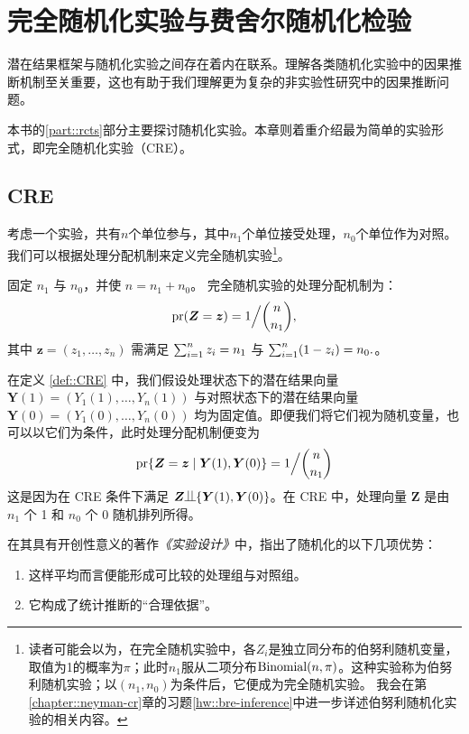 
\chapter{完全随机化实验与费舍尔随机化检验}\label{ch::frt-cre}


潜在结果框架与随机化实验之间存在着内在联系。理解各类随机化实验中的因果推断机制至关重要，这也有助于我们理解更为复杂的非实验性研究中的因果推断问题。  


本书的\ref{part::rcts}部分主要探讨随机化实验。本章则着重介绍最为简单的实验形式，即完全随机化实验（CRE）。 

\section{CRE}

考虑一个实验，共有$n$个单位参与，其中$n_1$个单位接受处理，$n_0$个单位作为对照。我们可以根据处理分配机制来定义完全随机实验\footnote{读者可能会以为，在完全随机实验中，各$Z_i$是独立同分布的伯努利随机变量，取值为1的概率为$\pi$；此时$n_1$服从二项分布$\textup{Binomial}(n,\pi)$。这种实验称为伯努利随机实验；以$(n_1, n_0)$为条件后，它便成为完全随机实验。
我会在第\ref{chapter::neyman-cr}章的习题\ref{hw::bre-inference}中进一步详述伯努利随机化实验的相关内容。
}。

\begin{definition}
[CRE]\label{def::CRE}
固定 $n_1$ 与 $n_0$，并使 $n = n_1 + n_0$。  
完全随机实验的处理分配机制为：
$$
\textup{pr}(  \bm{Z} = \bm{z} ) = 1 \Big / \binom{n}{n_1},
$$  
其中 $\bm{z} = (z_1,\ldots, z_n)$ 需满足 $\sum_{i=1}^n z_i  = n_1$ 与 $\sum_{i=1}^n (1-z_i)  = n_0 . $。
\end{definition}


在定义 \ref{def::CRE} 中，我们假设处理状态下的潜在结果向量 $\bm{Y}(1) = (Y_1(1), \ldots, Y_n(1) )$ 与对照状态下的潜在结果向量 $\bm{Y}(0) = (Y_1(0), \ldots, Y_n(0) )$ 均为固定值。即便我们将它们视为随机变量，也可以以它们为条件，此时处理分配机制便变为
$$
\textup{pr}\{    \bm{Z} = \bm{z} \mid \bm{Y}(1), \bm{Y}(0)  \} = 1 \Big / \binom{n}{n_1} 
$$
这是因为在 CRE 条件下满足 $ \bm{Z} \ind \{\bm{Y}(1), \bm{Y}(0)\}$。在 CRE 中，处理向量 $\bm{Z}$ 是由 $n_1$ 个 1 和 $n_0$ 个 0 随机排列所得。

在其具有开创性意义的著作{\it《实验设计》}中，\citet{Fisher:1935}指出了随机化的以下几项优势：
\begin{enumerate}
[(1)]
\item\label{eq::comparable}
这样平均而言便能形成可比较的处理组与对照组。

\item\label{eq::reasonedbasis}
它构成了统计推断的“合理依据”。 
 \end{enumerate}
 
